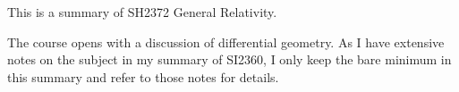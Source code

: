 This is a summary of SH2372 General Relativity.

The course opens with a discussion of differential geometry. As I have extensive notes on the subject in my summary of SI2360, I only keep the bare minimum in this summary and refer to those notes for details.